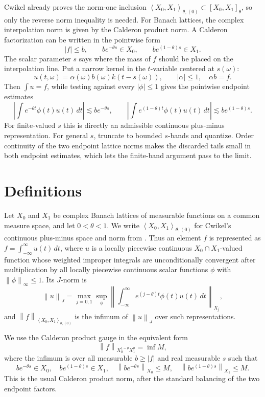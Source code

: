 \documentclass[11pt]{article}
\newcommand{\PM}{\left\langle X_0,X_1\right\rangle_{\theta,(0)}}
\newcommand{\Cplx}{\left[X_0,X_1\right]_\theta}
\newcommand{\Cal}{X_0^{1-\theta}X_1^\theta}
\newcommand{\norm}[1]{\left\lVert #1\right\rVert}
\begin{document}
Cwikel already proves the norm-one inclusion
$\PM\subset \Cplx$, so only the reverse norm inequality is needed.
For Banach lattices, the complex interpolation norm is given by the
Calderon product norm.  A Calderon factorization can be written in the
pointwise form
\[
 |f|\le b,\qquad b e^{-\theta s}\in X_0,\qquad
 b e^{(1-\theta)s}\in X_1 .
\]
The scalar parameter $s$ says where the mass of $f$ should be placed on
the interpolation line.  Put a narrow kernel in the $t$-variable centered
at $s(\omega)$:
\[
 u(t,\omega)=\alpha(\omega)b(\omega)k(t-s(\omega)),
 \qquad |\alpha|\le 1,\quad \alpha b=f.
\]
Then $\int u=f$, while testing against every $|\phi|\le 1$ gives the
pointwise endpoint estimates
\[
\left|\int e^{-\theta t}\phi(t)u(t)\,dt\right|
 \lesssim b e^{-\theta s},\qquad
\left|\int e^{(1-\theta)t}\phi(t)u(t)\,dt\right|
 \lesssim b e^{(1-\theta)s}.
\]
For finite-valued $s$ this is directly an admissible continuous
plus-minus representation.  For general $s$, truncate to bounded
$s$-bands and quantize.  Order continuity of the two endpoint lattice
norms makes the discarded tails small in both endpoint estimates, which
lets the finite-band argument pass to the limit.

\section*{Definitions}

Let $X_0$ and $X_1$ be complex Banach lattices of measurable functions
on a common measure space, and let $0<\theta<1$.  We write
$\PM$ for Cwikel's continuous plus-minus space and norm from
\cite[Section 3]{Cwikel2015}.  Thus an element $f$ is represented as
$f=\int_{-\infty}^{\infty}u(t)\,dt$, where $u$ is a locally piecewise
continuous $X_0\cap X_1$-valued function whose weighted improper
integrals are unconditionally convergent after multiplication by all
locally piecewise continuous scalar functions $\phi$ with
$\norm{\phi}_\infty\le 1$.  Its $J$-norm is
\[
\norm{u}_J
=\max_{j=0,1}\sup_{\phi}
\left\|\int_{-\infty}^{\infty} e^{(j-\theta)t}\phi(t)u(t)\,dt
\right\|_{X_j},
\]
and $\norm{f}_{\PM}$ is the infimum of $\norm{u}_J$ over such
representations.

We use the Calderon product gauge in the equivalent form
\[
\norm{f}_{\Cal}
=\inf M,
\]
where the infimum is over all measurable $b\ge |f|$ and real measurable
$s$ such that
\[
 b e^{-\theta s}\in X_0,\quad
 b e^{(1-\theta)s}\in X_1,\quad
 \norm{b e^{-\theta s}}_{X_0}\le M,\quad
 \norm{b e^{(1-\theta)s}}_{X_1}\le M .
\]
This is the usual Calderon product norm, after the standard balancing of
the two endpoint factors.
\end{document}
